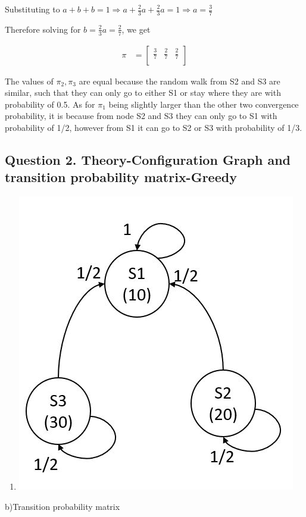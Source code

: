 \documentclass[11pt]{article}
\makeatletter
\def\maxwidth{\ifdim\Gin@nat@width>\linewidth\linewidth
    \else\Gin@nat@width\fi}
\let\Oldincludegraphics\includegraphics
\renewcommand{\includegraphics}[1]{\Oldincludegraphics[width=.8\maxwidth]{#1}}
\providecommand{\tightlist}{%
      \setlength{\itemsep}{0pt}\setlength{\parskip}{0pt}}
\makeatother
\begin{document}
Substituting to
\(a+b+b=1 \Rightarrow a+\frac{2}{3}a+\frac{2}{3}a = 1 \Rightarrow a = \frac{3}{7}\)

 Therefore solving for \(b = \frac{2}{3}a = \frac{2}{7}\), we get

\begin{align*}
\pi &= 
\begin{bmatrix}
\frac{3}{7} & \frac{2}{7} & \frac{2}{7} \\
\end{bmatrix}
\end{align*}

The values of \(\pi_2,\pi_3\) are equal because the random walk from S2
and S3 are similar, such that they can only go to either S1 or stay
where they are with probability of 0.5. As for \(\pi_1\) being slightly
larger than the other two convergence probability, it is because from
node S2 and S3 they can only go to S1 with probability of 1/2, however
from S1 it can go to S2 or S3 with probability of 1/3.

    \subsection*{Question 2. Theory-Configuration Graph and transition
probability
matrix-Greedy}\label{question-2.-theory-configuration-graph-and-transition-probability-matrix-greedy}

\begin{enumerate}
\def\labelenumi{\alph{enumi})}
\tightlist
\item
  \includegraphics{2a} 
\end{enumerate}
\medbreak 
b)Transition probability matrix
\end{document}
